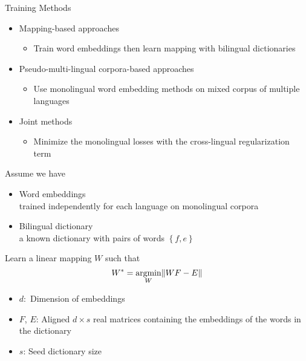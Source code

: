\documentclass[11pt, a4paper, landscape]{article}
\newcommand*{\argmin}{\ensuremath{\operatornamewithlimits{argmin}}\xspace}
\begin{document}
	\NewPage
	\vfill

	

	
	
	
	
	Training Methods
	\begin{itemize}
		\item Mapping-based approaches
		\begin{itemize}
			\item Train word embeddings then learn mapping with bilingual dictionaries
		\end{itemize}
		\item Pseudo-multi-lingual corpora-based approaches
		\begin{itemize}
			\item Use monolingual word embedding methods on mixed corpus of multiple languages 
		\end{itemize}
		\item Joint methods
		\begin{itemize}
			\item Minimize the monolingual losses with the cross-lingual regularization term
		\end{itemize}
	\end{itemize}
	
	\vfill
	\NewPage
	\vfill
	Assume we have
	\begin{itemize}
		\item Word embeddings \\
		trained  independently for each language on monolingual corpora
		\item Bilingual dictionary \\
		a known dictionary with pairs of words ${ \left\{ f, e \right\} }$
	\end{itemize}
	
	
	
	Learn a linear mapping ${W}$ such that
	\[W^*= \argmin\limits_{W} \lVert WF-E\rVert \]
	\begin{itemize}
		\item ${d:}$ Dimension of embeddings
		\item ${F}$, ${E}$: Aligned ${d \times s }$ real matrices containing the embeddings of the words in the dictionary
		\item ${s}$: Seed dictionary size
	\end{itemize}
	\vfill
	
\end{document}
